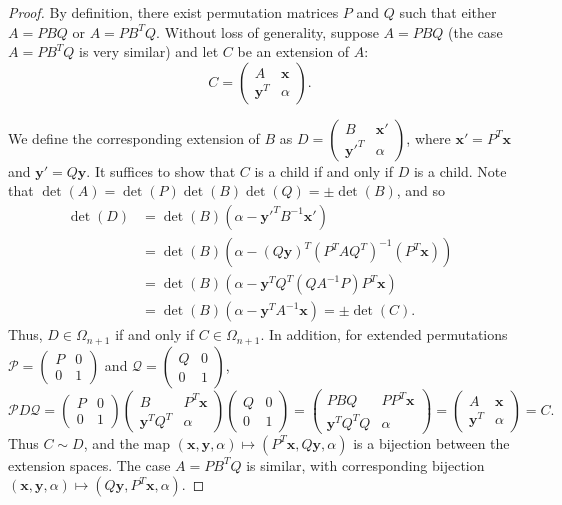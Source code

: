 \documentclass[reqno]{amsart}
\numberwithin{equation}{section}
\begin{document}
\begin{proof}
By definition, there exist permutation matrices $P$ and $Q$ such that either $A = P B Q$ or $A = P B^T Q$. Without loss of generality, suppose $A = P BQ$ (the case $A = P B^T Q$ is very similar) and let $C$ be an extension of $A$:
\[
C = \begin{pmatrix} A & \mathbf{x} \\ \mathbf{y}^T & \alpha \end{pmatrix}.
\]

We define the corresponding extension of $B$ as $D = \begin{pmatrix} B & \mathbf{x}' \\ \mathbf{y}'^T & \alpha \end{pmatrix}$, where $\mathbf{x}' = P^T \mathbf{x}$ and $\mathbf{y}' = Q \mathbf{y}$. It suffices to show that $C$ is a child if and only if $D$ is a child. Note that $\det(A) = \det(P)\det(B)\det(Q) = \pm \det(B)$, and so
\begin{align*}
\det(D) &= \det(B)(\alpha - \mathbf{y}'^T B^{-1} \mathbf{x}') \\
&= \det(B)(\alpha - (Q\mathbf{y})^T (P^T A Q^T)^{-1} (P^T \mathbf{x})) \\
&= \det(B)(\alpha - \mathbf{y}^T Q^T (Q A^{-1} P) P^T \mathbf{x}) \\
&= \det(B)(\alpha - \mathbf{y}^T A^{-1} \mathbf{x}) = \pm \det(C).
\end{align*}
Thus, $D \in \Omega_{n+1}$ if and only if $C \in \Omega_{n+1}$. In addition, for extended permutations $\mathcal{P} = \begin{pmatrix} P & 0 \\ 0 & 1 \end{pmatrix}$ and $\mathcal{Q} = \begin{pmatrix} Q & 0 \\ 0 & 1 \end{pmatrix}$,
\[
\mathcal{P} D \mathcal{Q} = \begin{pmatrix} P & 0 \\ 0 & 1 \end{pmatrix} \begin{pmatrix} B & P^T \mathbf{x} \\ \mathbf{y}^T Q^T & \alpha \end{pmatrix} \begin{pmatrix} Q & 0 \\ 0 & 1 \end{pmatrix} 
= \begin{pmatrix} P B Q & P P^T \mathbf{x} \\ \mathbf{y}^T Q^T Q & \alpha \end{pmatrix} 
= \begin{pmatrix} A & \mathbf{x} \\ \mathbf{y}^T & \alpha \end{pmatrix} = C.
\]
Thus $C \sim D$, and the map $(\mathbf{x}, \mathbf{y}, \alpha) \mapsto (P^T\mathbf{x}, Q\mathbf{y}, \alpha)$ is a bijection between the extension spaces. The case $A = P B^T Q$ is similar, with corresponding bijection $(\mathbf{x}, \mathbf{y}, \alpha) \mapsto (Q\mathbf{y}, P^T\mathbf{x}, \alpha)$.
\end{proof}
\end{document}
